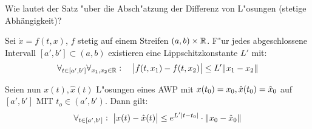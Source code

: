 \documentclass[9pt]{article}
\newcommand{\R}[1]{%
	\ifthenelse{\equal{#1}{}}
	{\mathbb{R}}
	{\mathbb{R}^{#1}}}%
\newenvironment{field}{}{\newpage}
\newif\ifnote
\newenvironment{note}{\notetrue}{\notefalse}
\newcommand{\localtag}{}
\newcommand{\globaltag}{}
\newcommand{\uuid}{}
\newcommand{\tags}[1]{
    \ifnote 
        \renewcommand{\localtag}{#1}
    \else
        \renewcommand{\globaltag}{#1}
    \fi 
    }
\newcommand{\xplain}[1]{\renewcommand{\uuid}{#1}}
\begin{document}
\begin{note}
	\xplain{439da001-039e-4c8c-8026-d4a44fef7f58}
	\tags{satz, 3.6}
	
	\begin{field}  %
		Wie lautet der Satz "uber die Absch"atzung der Differenz von L"osungen (stetige Abhängigkeit)?
	\end{field}
	
	\begin{field}  %
		Sei $\dot{x}=f(t,x)$, $f$ stetig auf einem Streifen $(a,b)\times \R{}$. F"ur jedes abgeschlossene Intervall $[a',b'] \subset (a,b)$ existieren eine Lippschitzkonstante $L'$ mit:
		\begin{equation*}
			\forall_{t \in [a', b']} \forall_{x_1, x_2 \in \R{}}: \quad
			\abs{f(t,x_1) - f(t,x_2)} \leq L'\norm{x_1 - x_2}
		\end{equation*}
		
		Seien nun $x(t), \hat{x}(t)$ L"osungen eines AWP mit $x(t_0)=x_0, \\  \hat{x}(t_0) = \hat{x}_0$
		auf $[a',b']$ MIT $t_o \in (a',b')$. Dann gilt:
		\begin{equation*}
			\forall_{t \in [a', b']}: \ \abs{x(t) - \hat{x}(t)} \leq e^{L'\abs{t-t_0}} \cdot \norm{x_0-\hat{x}_0}
		\end{equation*}
	\end{field}
\end{note}
\end{document}
